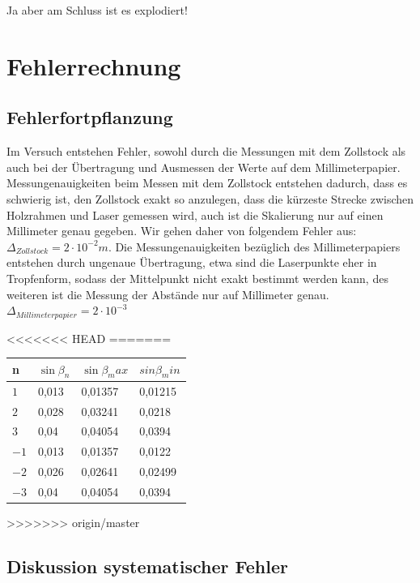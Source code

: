 \documentclass[12pt,a4paper,titlepage,headinclude,bibtotoc]{scrartcl}
\begin{document}
Ja aber am Schluss ist es explodiert!

\section{Fehlerrechnung}
\subsection{Fehlerfortpflanzung}
Im Versuch entstehen Fehler, sowohl durch die Messungen mit dem Zollstock als auch bei der Übertragung und Ausmessen der Werte auf dem Millimeterpapier. Messungenauigkeiten beim Messen mit dem Zollstock entstehen dadurch, dass es schwierig ist, den Zollstock exakt so anzulegen, dass die kürzeste Strecke zwischen Holzrahmen und Laser gemessen wird, auch ist die Skalierung nur auf einen Millimeter genau gegeben. Wir gehen daher von folgendem Fehler aus: $\Delta_{Zollstock}={2} \cdot{10^{-2}}m$. Die Messungenauigkeiten bezüglich des Millimeterpapiers entstehen durch ungenaue Übertragung, etwa sind die Laserpunkte eher in Tropfenform, sodass der Mittelpunkt nicht exakt bestimmt werden kann, des weiteren ist die Messung der Abstände nur auf Millimeter genau. $\Delta_{Millimeterpapier}={2} \cdot {10^{-3}}$

<<<<<<< HEAD
=======
\par

\centering
\begin{table} [h]
\begin{tabular}{|p{2 cm}||p{3 cm}|p{3 cm}|p{3 cm}|}
		\hline
         n & $\sin\beta_n$  & $\sin\beta_max $ & $sin\beta_min$ \\
         \hline 
         $1 $& 0,013& 0,01357 & 0,01215 \\
         \hline
         $2 $& 0,028&  0,03241 &0,0218 \\
         \hline
         $3 $& 0,04& 0,04054& 0,0394\\
         \hline
         $-1$& 0,013&  0,01357& 0,0122 \\
         \hline
         $-2$& 0,026& 0,02641 & 0,02499 \\
         \hline             
         $-3$& 0,04& 0,04054  & 0,0394 \\
         \hline
\end{tabular}
\end{table}
>>>>>>> origin/master
    

\subsection{Diskussion systematischer Fehler}
\end{document}
